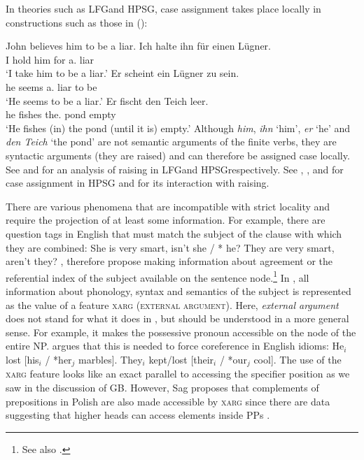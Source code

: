 In theories such as LFG\indexlfg and HPSG\indexhpsg, case assignment takes place locally in constructions
such as those in ():

\eal
\ex John believes him to be a liar.
\ex 
\gll Ich halte ihn für einen Lügner.\\
	 I hold him for a.\acc{} liar\\
\glt `I take him to be a liar.'
\ex 
\gll Er scheint ein Lügner zu sein.\\
	 he seems a.\nom{} liar to be\\
\glt `He seems to be a liar.'	 
\ex 
\gll Er fischt den Teich leer.\\
	 he fishes the.\acc{} pond empty\\
\glt `He fishes (in) the pond (until it is) empty.'
\zl
Although \emph{him}, \emph{ihn} `him', \emph{er} `he' and \emph{den Teich} `the pond' are not semantic arguments of the finite verbs, they are syntactic arguments
(they are raised) and can therefore be assigned case locally. See  and 
for an analysis of raising in LFG\indexlfg and HPSG\indexhpsg respectively. See , , and
 for case assignment in HPSG and for its interaction with raising.

There are various phenomena that are incompatible with strict locality and require the projection of at least some information.
For example, there are question tags in English that must match the subject of the clause with which
they are combined:
\eal
\ex She is very smart, isn't she / * he?
\ex They are very smart, aren't they?
\zl
\citet{BF99a}, \citet{FB2003a} therefore propose making information about agreement or the referential index of the subject
available on the sentence node.\footnote{%
  See also .
}
In \citet{Sag2007a}, all information about phonology, syntax and semantics of the subject is represented as the value of a feature \textsc{xarg} (\textsc{external argument}).
Here, \emph{external argument} does not stand for what it does in \gbt, but should be understood in a more general sense. For example, it makes the possessive pronoun
accessible on the node of the entire NP. \citet{Sag2007a} argues that this is needed to force coreference in English idioms:
\eal
\ex He$_i$ lost [his$_i$ / *her$_j$ marbles].
\ex They$_i$ kept/lost [their$_i$ / *our$_j$ cool].
\zl
\addlines
The use of the \textsc{xarg} feature looks like an exact parallel to accessing the specifier position as we saw in the discussion of GB. However, Sag proposes that complements of prepositions
in Polish are also made accessible by \textsc{xarg} since there are data suggesting that higher heads can access elements inside PPs \citep[Section~5.4.1.2]{Prze99b}.

